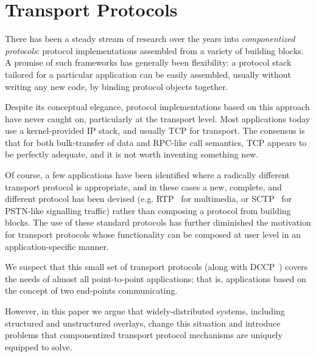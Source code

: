 \chapter[Transport Protocols]{Transport Protocols}


There has been a steady stream of research over the years into
\emph{componentized protocols}: protocol 
implementations assembled from a variety of building blocks.  A 
promise of such frameworks has generally been
flexibility: a protocol stack tailored for a particular application
can be easily assembled, usually without writing any new code, by
binding protocol objects together. 


Despite its conceptual elegance, protocol
implementations based on this approach have never
caught on, particularly at the transport level.  Most
applications today use a
kernel-provided IP stack, and usually TCP for transport.  The consensus is that 
for both bulk-transfer of data and RPC-like call semantics, TCP appears to be
perfectly adequate, and it is not worth inventing something new.


Of course, a few applications have been identified where a radically different
transport protocol is appropriate, and in these cases a
new, complete, and different protocol has been devised
(e.g. RTP~\cite{rfc:1889}  for multimedia, or SCTP~\cite{rfc:2960}
for PSTN-like signalling traffic) rather than composing a protocol
from building blocks.  The use of these standard protocols has further
diminished the motivation for  transport protocols whose functionality
can be composed at user level in an application-specific manner.  


We suspect that this small set of transport protocols (along with
DCCP~\cite{dccp-problem}) covers the needs of almost all
point-to-point applications; that is, applications based on the
concept of two end-points communicating. 


However, in this paper we argue that widely-distributed systems,
including structured and unstructured overlays, change this situation
and introduce problems that componentized transport protocol
mechanisms are uniquely equipped to solve.  

